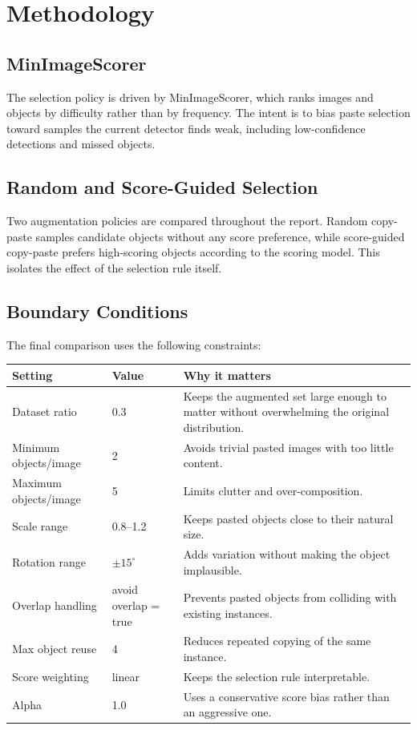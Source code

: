 \section{Methodology}

\subsection{MinImageScorer}
The selection policy is driven by MinImageScorer, which ranks images and objects by difficulty rather than by frequency. The intent is to bias paste selection toward samples the current detector finds weak, including low-confidence detections and missed objects.

\subsection{Random and Score-Guided Selection}
Two augmentation policies are compared throughout the report. Random copy-paste samples candidate objects without any score preference, while score-guided copy-paste prefers high-scoring objects according to the scoring model. This isolates the effect of the selection rule itself.

\subsection{Boundary Conditions}
The final comparison uses the following constraints:
\begin{center}
\small
\begin{tabular}{@{}p{}p{}p{}@{}}
\toprule
\textbf{Setting} & \textbf{Value} & \textbf{Why it matters} \\
\midrule
Dataset ratio & 0.3 & Keeps the augmented set large enough to matter without overwhelming the original distribution. \\
Minimum objects/image & 2 & Avoids trivial pasted images with too little content. \\
Maximum objects/image & 5 & Limits clutter and over-composition. \\
Scale range & 0.8--1.2 & Keeps pasted objects close to their natural size. \\
Rotation range & $\pm 15^\circ$ & Adds variation without making the object implausible. \\
Overlap handling & avoid overlap = true & Prevents pasted objects from colliding with existing instances. \\
Max object reuse & 4 & Reduces repeated copying of the same instance. \\
Score weighting & linear & Keeps the selection rule interpretable. \\
Alpha & 1.0 & Uses a conservative score bias rather than an aggressive one. \\
\bottomrule
\end{tabular}
\end{center}

